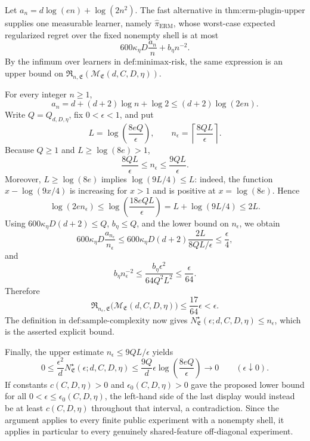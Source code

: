 Let \(a_n=d\log(en)+\log(2n^2)\). The fast alternative in \(\text{thm:erm-plugin-upper}\) supplies one measurable learner, namely \(\widehat\pi_{\mathrm{ERM}}\), whose worst-case expected regularized regret over the fixed nonempty shell is at most
\[
600\kappa_\eta D\frac{a_n}{n}+b_\eta n^{-2}.
\]
By the infimum over learners in \(\text{def:minimax-risk}\), the same expression is an upper bound on \(\mathfrak R_{n,\mathfrak E}(\mathcal M_{\mathfrak E}(d,C,D,\eta))\).

For every integer \(n\ge1\),
\[
a_n=d+(d+2)\log n+\log2
\le(d+2)\log(2en).
\]
Write \(Q=Q_{d,D,\eta}\), fix \(0<\epsilon<1\), and put
\[
L=\log\!\left(\frac{8eQ}{\epsilon}\right),
\qquad
n_\epsilon=\left\lceil\frac{8QL}{\epsilon}\right\rceil.
\]
Because \(Q\ge1\) and \(L\ge\log(8e)>1\),
\[
\frac{8QL}{\epsilon}\le n_\epsilon\le\frac{9QL}{\epsilon}.
\]
Moreover, \(L\ge\log(8e)\) implies \(\log(9L/4)\le L\): indeed, the function \(x-\log(9x/4)\) is increasing for \(x>1\) and is positive at \(x=\log(8e)\). Hence
\[
\log(2en_\epsilon)
\le\log\!\left(\frac{18eQL}{\epsilon}\right)
=L+\log(9L/4)
\le2L.
\]
Using \(600\kappa_\eta D(d+2)\le Q\), \(b_\eta\le Q\), and the lower bound on \(n_\epsilon\), we obtain
\[
600\kappa_\eta D\frac{a_{n_\epsilon}}{n_\epsilon}
\le
600\kappa_\eta D(d+2)\frac{2L}{8QL/\epsilon}
\le\frac\epsilon4,
\]
and
\[
b_\eta n_\epsilon^{-2}
\le\frac{b_\eta\epsilon^2}{64Q^2L^2}
\le\frac\epsilon{64}.
\]
Therefore
\[
\mathfrak R_{n_\epsilon,\mathfrak E}
\bigl(\mathcal M_{\mathfrak E}(d,C,D,\eta)\bigr)
\le\frac{17}{64}\epsilon<\epsilon.
\]
The definition in \(\text{def:sample-complexity}\) now gives \(N^\star_{\mathfrak E}(\epsilon;d,C,D,\eta)\le n_\epsilon\), which is the asserted explicit bound.

Finally, the upper estimate \(n_\epsilon\le9QL/\epsilon\) yields
\[
0\le
\frac{\epsilon^2}{d}N^\star_{\mathfrak E}(\epsilon;d,C,D,\eta)
\le\frac{9Q}{d}\epsilon
\log\!\left(\frac{8eQ}{\epsilon}\right)
\longrightarrow0
\qquad(\epsilon\downarrow0).
\]
If constants \(c(C,D,\eta)>0\) and \(\epsilon_0(C,D,\eta)>0\) gave the proposed lower bound for all \(0<\epsilon\le\epsilon_0(C,D,\eta)\), the left-hand side of the last display would instead be at least \(c(C,D,\eta)\) throughout that interval, a contradiction. Since the argument applies to every finite public experiment with a nonempty shell, it applies in particular to every genuinely shared-feature off-diagonal experiment.